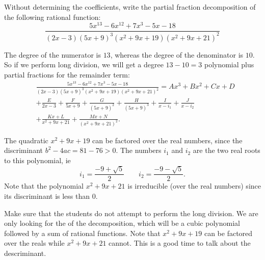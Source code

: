 \documentclass[noinstructornotes]{ximera}
\begin{document}
\begin{problem}
Without determining the coefficients, write the partial fraction decomposition of the following rational function:
	\[
	\frac{5x^{13} - 6x^{12} + 7x^3 - 5x - 18}{(2x-3)(5x+9)^3 (x^2+9x+19)(x^2+9x+21)^2}
	\]
	\begin{freeResponse}
	The degree of the numerator is $13$, whereas the degree of the denominator is $10$.  
	So if we perform long division, we will get a degree $13-10=3$ polynomial plus partial fractions for the remainder term:
		\begin{align*}
		&\frac{5x^{13} - 6x^{12} + 7x^3 - 5x - 18}{(2x-3)(5x+9)^3 (x^2+9x+19)(x^2+9x+21)^2} = Ax^3 + Bx^2 + Cx + D  \\
		&+ \frac{E}{2x-3} + \frac{F}{5x+9} + \frac{G}{(5x+9)^2} + \frac{H}{(5x+9)^3} + \frac{I}{x-i_1} + \frac{J}{x-i_2}  \\
		&+ \frac{Kx+L}{x^2+9x+21} + \frac{Mx+N}{(x^2+9x+21)^2}.
		\end{align*}
		
	The quadratic $x^2+9x+19$ can be factored over the real numbers, since the discriminant $b^2-4ac = 81-76 > 0$.  
	The numbers $i_1$ and $i_2$ are the two real roots to this polynomial, ie
		\[
		i_1 = \frac{-9+\sqrt{5}}{2}	\qquad	i_2=\frac{-9 - \sqrt{5}}{2}.
		\]
	Note that the polynomial $x^2+9x+21$ is irreducible (over the real numbers) since its discriminant is less than $0$.  
	\end{freeResponse}
	
\end{problem}

\begin{instructorNotes}
Make sure that the students do not attempt to perform the long division.  
We are only looking for the  of the decomposition, which will be a cubic polynomial followed by a sum of rational functions.  
Note that $x^2 + 9x +19$ can be factored over the reals while $x^2 + 9x + 21$ cannot.  
This is a good time to talk about the descriminant.
\end{instructorNotes}
\end{document}
